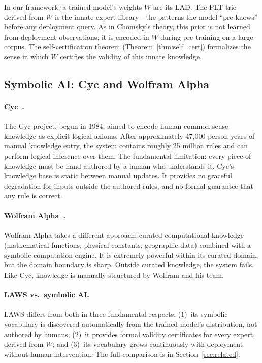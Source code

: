 \documentclass[11pt]{article}
\begin{document}
In our framework: a trained model's weights $W$ are its LAD.  The PLT trie
derived from $W$ is the innate expert library---the patterns the model
``pre-knows'' before any deployment query.  As in Chomsky's theory, this prior
is not learned from deployment observations; it is encoded in $W$ during
pre-training on a large corpus.  The self-certification theorem
(Theorem~\ref{thm:self_cert}) formalizes the sense in which $W$ certifies
the validity of this innate knowledge.

\subsection{Symbolic AI: Cyc and Wolfram Alpha}

\paragraph{Cyc~\cite{lenat1995}.}
The Cyc project, begun in 1984, aimed to encode human common-sense knowledge as
explicit logical axioms.  After approximately 47,000 person-years of manual
knowledge entry, the system contains roughly 25 million rules and can perform
logical inference over them.  The fundamental limitation: every piece of
knowledge must be hand-authored by a human who understands it.  Cyc's knowledge
base is static between manual updates.  It provides no graceful degradation for
inputs outside the authored rules, and no formal guarantee that any rule is
correct.

\paragraph{Wolfram Alpha~\cite{wolfram2002}.}
Wolfram Alpha takes a different approach: curated computational knowledge
(mathematical functions, physical constants, geographic data) combined with a
symbolic computation engine.  It is extremely powerful within its curated domain,
but the domain boundary is sharp.  Outside curated knowledge, the system fails.
Like Cyc, knowledge is manually structured by Wolfram and his team.

\paragraph{LAWS vs.\ symbolic AI.}
LAWS differs from both in three fundamental respects: (1)~its symbolic
vocabulary is discovered automatically from the trained model's distribution,
not authored by humans; (2)~it provides formal validity certificates for every
expert, derived from $W$; and (3)~its vocabulary grows continuously with
deployment without human intervention.  The full comparison is in
Section~\ref{sec:related}.
\end{document}
